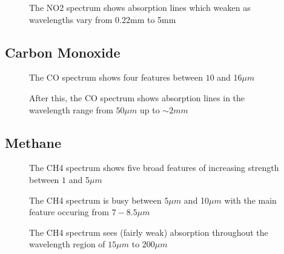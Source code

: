 \documentclass[12pt]{article}
\begin{document}
\vspace*{11.5cm}
\begin{figure}[htb]
\caption{The NO2 spectrum shows absorption lines which weaken as wavelengths
 vary from 0.22mm to 5mm}
\end{figure}
\newpage

\subsection{Carbon Monoxide}

\vspace*{11.5cm}
\begin{figure}[htb]
\caption{The CO spectrum shows four features between
  $10$ and  16$\mu m$}
\end{figure}
\newpage

\vspace*{11.5cm}
\begin{figure}[htb]
\caption{After this, the  CO spectrum shows absorption lines in the wavelength range from
 $50 \mu m$ up to $\sim 2mm$}
\end{figure}
\newpage

\subsection{Methane}

\vspace*{11.5cm}
\begin{figure}[htb]
\caption{The CH4 spectrum shows five broad features of increasing strength between
  $1$ and  5$\mu m$}
\end{figure}
\newpage

\vspace*{11.5cm}
\begin{figure}[htb]
\caption{The CH4 spectrum is busy between $5\mu m$ and 10$\mu m$ with the main feature 
occuring from $7-8.5 \mu m$}
\end{figure}
\newpage


\vspace*{11.5cm}
\begin{figure}[htb]
\caption{The CH4 spectrum sees (fairly weak) absorption throughout the
 wavelength region of $15\mu m$ to 200$\mu m$}
\end{figure}
\newpage
\end{document}
